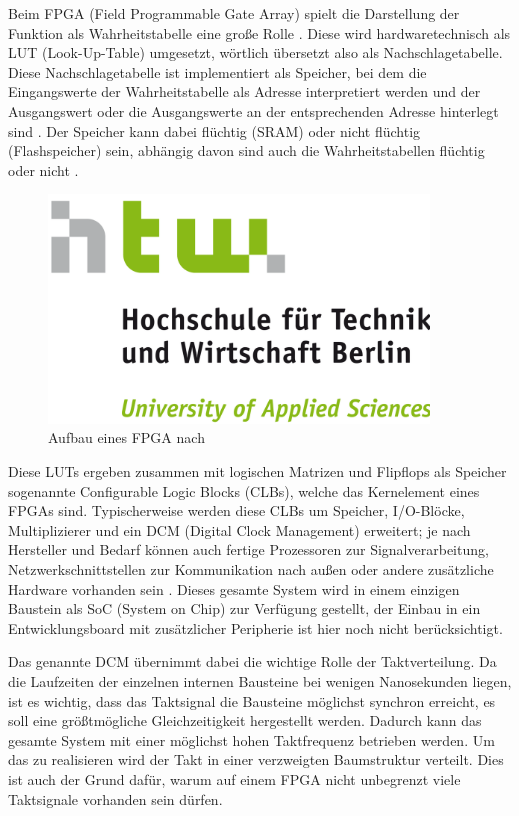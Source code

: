 \documentclass[11pt,a4paper,titlepage]{article}
\begin{document}
Beim FPGA (Field Programmable Gate Array) spielt die Darstellung der Funktion als Wahrheitstabelle eine große Rolle \cite[S. 716]{Tietze}. Diese wird hardwaretechnisch als LUT (Look-Up-Table) umgesetzt, wörtlich übersetzt also als Nachschlagetabelle. Diese Nachschlagetabelle ist implementiert als Speicher, bei dem die Eingangswerte der Wahrheitstabelle als Adresse interpretiert werden und der Ausgangswert oder die Ausgangswerte an der entsprechenden Adresse hinterlegt sind \cite{Puschmann2}. Der Speicher kann dabei flüchtig (SRAM) oder nicht flüchtig (Flashspeicher) sein, abhängig davon sind auch die Wahrheitstabellen flüchtig oder nicht \cite{Puschmann2}.\\

\begin{figure}[!ht]
\centering
\includegraphics[width=0.9\textwidth]{images/htw_hochschule.png}
\caption{Aufbau eines FPGA nach \cite{FPGA_struktur}}
\label{img:FPGA}
\end{figure}

Diese LUTs ergeben zusammen mit logischen Matrizen und Flipflops als Speicher sogenannte Configurable Logic Blocks (CLBs), welche das Kernelement eines FPGAs sind. Typischerweise werden diese CLBs um Speicher, I/O-Blöcke, Multiplizierer und ein DCM (Digital Clock Management) erweitert; je nach Hersteller und Bedarf können auch fertige Prozessoren zur Signalverarbeitung, Netzwerkschnittstellen zur Kommunikation nach außen oder andere zusätzliche Hardware vorhanden sein \cite{Puschmann2}. Dieses gesamte System wird in einem einzigen Baustein als SoC (System on Chip) zur Verfügung gestellt, der Einbau in ein Entwicklungsboard mit zusätzlicher Peripherie ist hier noch nicht berücksichtigt.

Das genannte DCM übernimmt dabei die wichtige Rolle der Taktverteilung. Da die Laufzeiten der einzelnen internen Bausteine bei wenigen Nanosekunden liegen, ist es wichtig, dass das Taktsignal die Bausteine möglichst synchron erreicht, es soll eine größtmögliche Gleichzeitigkeit hergestellt werden. Dadurch kann das gesamte System mit einer möglichst hohen Taktfrequenz betrieben werden. Um das zu realisieren wird der Takt in einer verzweigten Baumstruktur verteilt. Dies ist auch der Grund dafür, warum auf einem FPGA nicht unbegrenzt viele Taktsignale vorhanden sein dürfen.\\
\end{document}
